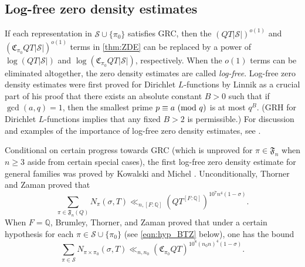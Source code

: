 \documentclass[11pt]{amsart}
\theoremstyle{remark}
\numberwithin{equation}{section}
\newcommand{\Q}{\mathbb{Q}}
\renewcommand{\pmod}[1]{\ (\textnormal{mod } #1)}
\begin{document}
\subsection{Log-free zero density estimates}
If each representation in  $\mathcal{S}\cup\{\pi_0\}$ satisfies GRC, then the $(QT|\mathcal{S}|)^{o(1)}$ and $(\mathfrak{C}_{\pi_0}QT|\mathcal{S}|)^{o(1)}$ terms in \cref{thm:ZDE} can be replaced by a power of $\log(QT|\mathcal{S}|)$ and $\log(\mathfrak{C}_{\pi_0}QT|\mathcal{S}|)$, respectively.  When the $o(1)$ terms can be eliminated altogether, the zero density estimates are called {\it log-free}. Log-free zero density estimates were first proved for Dirichlet $L$-functions by Linnik \cite{Linnik} as a crucial part of his proof that there exists an absolute constant $B>0$ such that if $\gcd(a,q)=1$, then the smallest prime $p\equiv a\pmod{q}$ is at most $q^B$.  (GRH for Dirichlet $L$-functions implies that any fixed $B>2$ is permissible.)  For discussion and examples of the importance of log-free zero density estimates, see \cite{BrumleyThornerZaman,HT_ZFR,IK,KanekoThorner,KM,Motohashi,SiuSound,soundararajan2019weak,TZ3,TZ_Sarkozy,Weiss}.

Conditional on certain progress towards GRC (which is unproved for $\pi\in\mathfrak{F}_n$ when $n\geq 3$ aside from certain special cases), the first log-free zero density estimate for general families was proved by Kowalski and Michel \cite{KM}.  Unconditionally, Thorner and Zaman \cite[Theorem 1.2]{TZ_GLn} proved that
\begin{equation}
\label{eqn:TZ_LFZDE}
\sum_{\pi\in\mathfrak{F}_n(Q)}N_{\pi}(\sigma,T)\ll_{n,[F:\Q]}(QT^{[F:\Q]})^{10^7 n^4 (1-\sigma)}.
\end{equation}
When $F=\Q$,  Brumley, Thorner, and Zaman \cite[Theorem 1.3]{BrumleyThornerZaman} proved that under a certain hypothesis for each $\pi\in\mathcal{S}\cup\{\pi_0\}$ (see \eqref{eqn:hyp_BTZ} below), one has the bound
\begin{equation}
\label{eqn:BTZ_LFZDE}
\sum_{\pi\in\mathcal{S}}N_{\pi\times\pi_0}(\sigma,T)\ll_{n,n_0}(\mathfrak{C}_{\pi_0}QT)^{10^8(n_0 n)^4(1-\sigma)}.
\end{equation}
\end{document}
